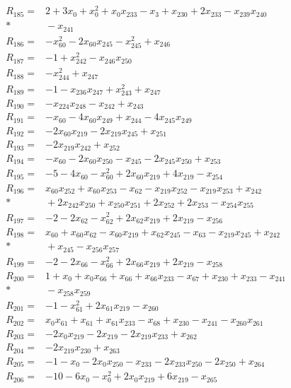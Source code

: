 \begin{align*}
R_{185}={}&2+3x_{0}+x_{0}^{2}+x_{0}x_{233}-x_{3}+x_{230}+2x_{233}-x_{239}x_{240}\\*
&{}-x_{241}\\[3pt]
R_{186}={}&-x_{60}^{2}-2x_{60}x_{245}-x_{245}^{2}+x_{246}\\[3pt]
R_{187}={}&-1+x_{242}^{2}-x_{246}x_{250}\\[3pt]
R_{188}={}&-x_{244}^{2}+x_{247}\\[3pt]
R_{189}={}&-1-x_{236}x_{247}+x_{243}^{2}+x_{247}\\[3pt]
R_{190}={}&-x_{224}x_{248}-x_{242}+x_{243}\\[3pt]
R_{191}={}&-x_{60}-4x_{60}x_{249}+x_{244}-4x_{245}x_{249}\\[3pt]
R_{192}={}&-2x_{60}x_{219}-2x_{219}x_{245}+x_{251}\\[3pt]
R_{193}={}&-2x_{219}x_{242}+x_{252}\\[3pt]
R_{194}={}&-x_{60}-2x_{60}x_{250}-x_{245}-2x_{245}x_{250}+x_{253}\\[3pt]
R_{195}={}&-5-4x_{60}-x_{60}^{2}+2x_{60}x_{219}+4x_{219}-x_{254}\\[3pt]
R_{196}={}&x_{60}x_{252}+x_{60}x_{253}-x_{62}-x_{219}x_{252}-x_{219}x_{253}+x_{242}\\*
&{}+2x_{242}x_{250}+x_{250}x_{251}+2x_{252}+2x_{253}-x_{254}x_{255}\\[3pt]
R_{197}={}&-2-2x_{62}-x_{62}^{2}+2x_{62}x_{219}+2x_{219}-x_{256}\\[3pt]
R_{198}={}&x_{60}+x_{60}x_{62}-x_{60}x_{219}+x_{62}x_{245}-x_{63}-x_{219}x_{245}+x_{242}\\*
&{}+x_{245}-x_{256}x_{257}\\[3pt]
R_{199}={}&-2-2x_{66}-x_{66}^{2}+2x_{66}x_{219}+2x_{219}-x_{258}\\[3pt]
R_{200}={}&1+x_{0}+x_{0}x_{66}+x_{66}+x_{66}x_{233}-x_{67}+x_{230}+x_{233}-x_{241}\\*
&{}-x_{258}x_{259}\\[3pt]
R_{201}={}&-1-x_{61}^{2}+2x_{61}x_{219}-x_{260}\\[3pt]
R_{202}={}&x_{0}x_{61}+x_{61}+x_{61}x_{233}-x_{68}+x_{230}-x_{241}-x_{260}x_{261}\\[3pt]
R_{203}={}&-2x_{0}x_{219}-2x_{219}-2x_{219}x_{233}+x_{262}\\[3pt]
R_{204}={}&-2x_{219}x_{230}+x_{263}\\[3pt]
R_{205}={}&-1-x_{0}-2x_{0}x_{250}-x_{233}-2x_{233}x_{250}-2x_{250}+x_{264}\\[3pt]
R_{206}={}&-10-6x_{0}-x_{0}^{2}+2x_{0}x_{219}+6x_{219}-x_{265}\\[3pt]

\end{align*}
